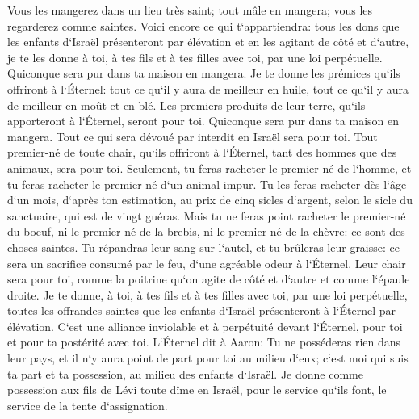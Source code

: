\verse Vous les mangerez dans un lieu très saint; tout mâle en mangera; vous les regarderez comme saintes. 
\verse Voici encore ce qui t`appartiendra: tous les dons que les enfants d`Israël présenteront par élévation et en les agitant de côté et d`autre, je te les donne à toi, à tes fils et à tes filles avec toi, par une loi perpétuelle. Quiconque sera pur dans ta maison en mangera. 
\verse Je te donne les prémices qu`ils offriront à l`Éternel: tout ce qu`il y aura de meilleur en huile, tout ce qu`il y aura de meilleur en moût et en blé. 
\verse Les premiers produits de leur terre, qu`ils apporteront à l`Éternel, seront pour toi. Quiconque sera pur dans ta maison en mangera. 
\verse Tout ce qui sera dévoué par interdit en Israël sera pour toi. 
\verse Tout premier-né de toute chair, qu`ils offriront à l`Éternel, tant des hommes que des animaux, sera pour toi. Seulement, tu feras racheter le premier-né de l`homme, et tu feras racheter le premier-né d`un animal impur. 
\verse Tu les feras racheter dès l`âge d`un mois, d`après ton estimation, au prix de cinq sicles d`argent, selon le sicle du sanctuaire, qui est de vingt guéras. 
\verse Mais tu ne feras point racheter le premier-né du boeuf, ni le premier-né de la brebis, ni le premier-né de la chèvre: ce sont des choses saintes. Tu répandras leur sang sur l`autel, et tu brûleras leur graisse: ce sera un sacrifice consumé par le feu, d`une agréable odeur à l`Éternel. 
\verse Leur chair sera pour toi, comme la poitrine qu`on agite de côté et d`autre et comme l`épaule droite. 
\verse Je te donne, à toi, à tes fils et à tes filles avec toi, par une loi perpétuelle, toutes les offrandes saintes que les enfants d`Israël présenteront à l`Éternel par élévation. C`est une alliance inviolable et à perpétuité devant l`Éternel, pour toi et pour ta postérité avec toi. 
\verse L`Éternel dit à Aaron: Tu ne posséderas rien dans leur pays, et il n`y aura point de part pour toi au milieu d`eux; c`est moi qui suis ta part et ta possession, au milieu des enfants d`Israël. 
\verse Je donne comme possession aux fils de Lévi toute dîme en Israël, pour le service qu`ils font, le service de la tente d`assignation. 
